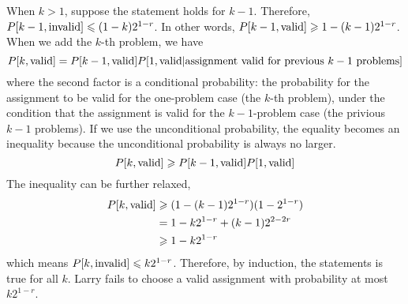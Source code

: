 \documentclass{article}
\begin{document}
When $k>1$, suppose the statement holds for $k-1$. Therefore, $P[k-1,\textup{invalid}]\leqslant(1-k)2^{1-r}$. In other words, $P[k-1,\textup{valid}]\geqslant 1-(k-1)2^{1-r}$. When we add the $k$-th problem, we have
\begin{equation*}
	P[k,\textup{valid}]=P[k-1,\textup{valid}]P[1,\textup{valid}|\textup{assignment valid for previous $k-1$ problems}]
\end{equation*}
where the second factor is a conditional probability: the probability for the assignment to be valid for the one-problem case (the $k$-th problem), under the condition that the assignment is valid for the $k-1$-problem case (the privious $k-1$ problems). If we use the unconditional probability, the equality becomes an inequality because the unconditional probability is always no larger.
\begin{equation*}
	P[k,\textup{valid}]\geqslant P[k-1,\textup{valid}]P[1,\textup{valid}]
\end{equation*}
The inequality can be further relaxed,
\begin{align*}
	P[k,\textup{valid}]&\geqslant(1-(k-1)2^{1-r})(1-2^{1-r})\\
	&=1-k2^{1-r}+(k-1)2^{2-2r}\\
	&\geqslant1-k2^{1-r}
\end{align*}
which means $P[k,\textup{invalid}]\leqslant k2^{1-r}$. Therefore, by induction, the statements is true for all $k$. Larry fails to choose a valid assignment with probability at most $k2^{1-r}$.
\end{document}
